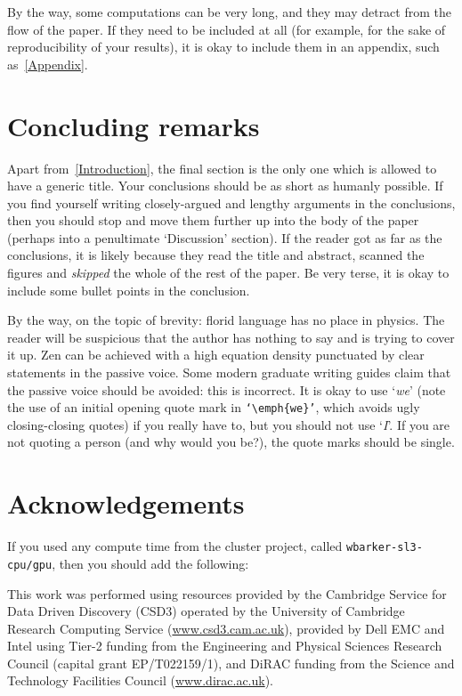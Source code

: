 \documentclass[aps,prd,reprint,preprintnumbers,showpacs,floatfix,nofootinbib,superscript address]{revtex4-2}
\begin{document}
By the way, some computations can be very long, and they may detract from the flow of the paper. If they need to be included at all (for example, for the sake of reproducibility of your results), it is okay to include them in an appendix, such as~\cref{Appendix}.

\section{Concluding remarks}\label{ConcludingRemarks}

Apart from~\cref{Introduction}, the final section is the only one which is allowed to have a generic title. Your conclusions should be as short as humanly possible. If you find yourself writing closely-argued and lengthy arguments in the conclusions, then you should stop and move them further up into the body of the paper (perhaps into a penultimate `Discussion' section). If the reader got as far as the conclusions, it is likely because they read the title and abstract, scanned the figures and \emph{skipped} the whole of the rest of the paper. Be very terse, it is okay to include some bullet points in the conclusion. 

By the way, on the topic of brevity: florid language has no place in physics. The reader will be suspicious that the author has nothing to say and is trying to cover it up. Zen can be achieved with a high equation density punctuated by clear statements in the passive voice. Some modern graduate writing guides claim that the passive voice should be avoided: this is incorrect. It is okay to use `\emph{we}' (note the use of an initial opening quote mark in \texttt{`\textbackslash emph\{we\}'}, which avoids ugly closing-closing quotes) if you really have to, but you should not use `\emph{I}'. If you are not quoting a person (and why would you be?), the quote marks should be single.

\section{Acknowledgements}

If you used any compute time from the cluster project, called \texttt{wbarker-sl3-cpu/gpu}, then you should add the following:

This work was performed using resources provided by the Cambridge Service for Data Driven Discovery (CSD3) operated by the University of Cambridge Research Computing Service (\href{www.csd3.cam.ac.uk}{www.csd3.cam.ac.uk}), provided by Dell EMC and Intel using Tier-2 funding from the Engineering and Physical Sciences Research Council (capital grant EP/T022159/1), and DiRAC funding from the Science and Technology Facilities Council (\href{www.dirac.ac.uk}{www.dirac.ac.uk}).
\end{document}
